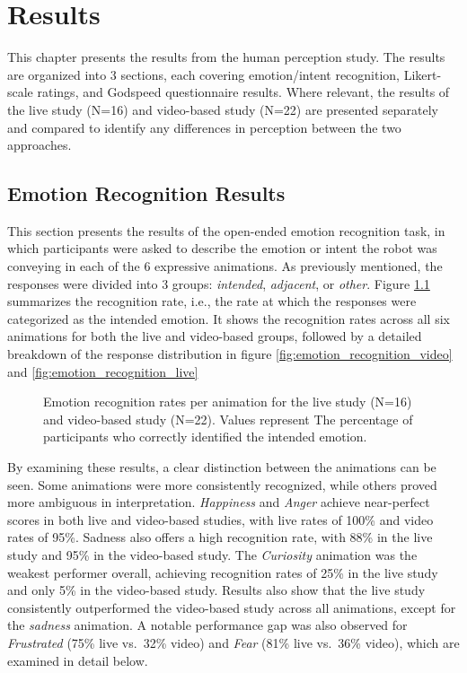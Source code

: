 \chapter{Results}
This chapter presents the results from the human perception study. The results are organized into 3 sections, each covering emotion/intent recognition, Likert-scale ratings, and Godspeed questionnaire results. Where relevant, the results of the live study (N=16) and video-based study (N=22) are presented separately and compared to identify any differences in perception between the two approaches.

\section{Emotion Recognition Results}
This section presents the results of the open-ended emotion recognition task, in which participants were asked to describe the emotion or intent the robot was conveying in each of the 6 expressive animations. As previously mentioned, the responses were divided into 3 groups: \textit{intended}, \textit{adjacent}, or \textit{other}. Figure \ref{fig:recognition_rate} summarizes the recognition rate, i.e., the rate at which the responses were categorized as the intended emotion. It shows the recognition rates across all six animations for both the live and video-based groups, followed by a detailed breakdown of the response distribution in figure \ref{fig:emotion_recognition_video} and \ref{fig:emotion_recognition_live}

\begin{figure}[H]
\centering

\caption[Emotion recognition rates per animation for the live
study]{Emotion recognition rates per animation for the live
study (N=16) and video-based study (N=22). Values represent
The percentage of participants who correctly identified the
intended emotion.}
\label{fig:recognition_rate}
\end{figure}

By examining these results, a clear distinction between the animations can be seen. Some animations were more consistently recognized, while others proved more ambiguous in interpretation. \textit{Happiness} and \textit{Anger} achieve near-perfect scores in both live and video-based studies, with live rates of 100\% and video rates of 95\%. Sadness also offers a high recognition rate, with 88\% in the live study and 95\% in the video-based study. The \textit{Curiosity} animation was the weakest performer overall, achieving recognition rates of 25\% in the live study and only 5\% in the video-based study. Results also show that the live study consistently outperformed the video-based study across all animations, except for the \textit{sadness} animation. A notable performance gap was also observed for \textit{Frustrated} (75\% live vs.\ 32\% video) and \textit{Fear} 
(81\% live vs.\ 36\% video), which are examined in detail below.

